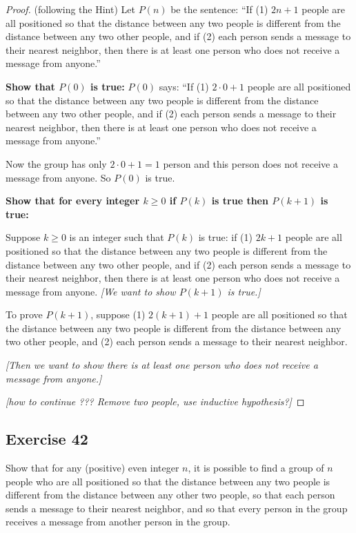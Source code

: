 \documentclass[14pt]{extarticle}
\begin{document}
\begin{proof}
(following the Hint) Let $P(n)$ be the sentence: ``If (1) $2n + 1$ people are all positioned so that the distance between any two people is different from the distance between any two other people, and if (2) each person sends a message to their nearest neighbor, then there is at least one person who does not receive a message from anyone.''

{\bf Show that $P(0)$ is true:} $P(0)$ says: ``If (1) $2 \cdot 0 + 1$ people are all positioned so that the distance between any two people is different from the distance between any two other people, and if (2) each person sends a message to their nearest neighbor, then there is at least one person who does not receive a message from anyone.'' 

Now the group has only $2 \cdot 0 + 1 = 1$ person and this person does not receive a message from anyone. So $P(0)$ is true.

{\bf Show that for every integer $k \geq 0$ if $P(k)$ is true then $P(k+1)$ is true:}

Suppose $k\geq 0$ is an integer such that $P(k)$ is true: if (1) $2k + 1$ people are all positioned so that the distance between any two people is different from the distance between any two other people, and if (2) each person sends a message to their nearest neighbor, then there is at least one person who does not receive a message from anyone. {\it [We want to show $P(k+1)$ is true.]}

To prove $P(k+1)$, suppose (1) $2(k+1) + 1$ people are all positioned so that the distance between any two people is different from the distance between any two other people, and (2) each person sends a message to their nearest neighbor.

{\it [Then we want to show there is at least one person who does not receive a message from anyone.]}

{\it [how to continue ??? Remove two people, use inductive hypothesis?]}
\end{proof}

\subsection{Exercise 42}
Show that for any (positive) even integer $n$, it is possible to find a group of $n$ people who are all positioned so that the distance between any two people is different from the distance between any other two people, so that each person sends a message to their nearest neighbor, and so that every person in the group receives a message from another person in the group.
\end{document}

